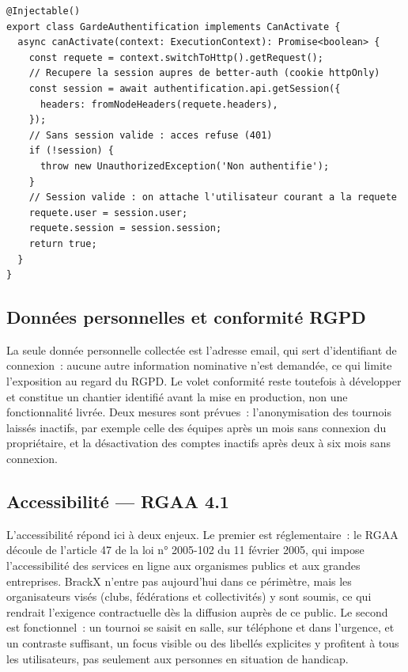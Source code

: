 \begin{lstlisting}
@Injectable()
export class GardeAuthentification implements CanActivate {
  async canActivate(context: ExecutionContext): Promise<boolean> {
    const requete = context.switchToHttp().getRequest();
    // Recupere la session aupres de better-auth (cookie httpOnly)
    const session = await authentification.api.getSession({
      headers: fromNodeHeaders(requete.headers),
    });
    // Sans session valide : acces refuse (401)
    if (!session) {
      throw new UnauthorizedException('Non authentifie');
    }
    // Session valide : on attache l'utilisateur courant a la requete
    requete.user = session.user;
    requete.session = session.session;
    return true;
  }
}
\end{lstlisting}

\subsection{Données personnelles et conformité RGPD}
La seule donnée personnelle collectée est l'adresse email, qui sert d'identifiant de connexion~: aucune autre information nominative n'est demandée, ce qui limite l'exposition au regard du RGPD. Le volet conformité reste toutefois à développer et constitue un chantier identifié avant la mise en production, non une fonctionnalité livrée. Deux mesures sont prévues~: l'anonymisation des tournois laissés inactifs, par exemple celle des équipes après un mois sans connexion du propriétaire, et la désactivation des comptes inactifs après deux à six mois sans connexion.

\subsection{Accessibilité — RGAA 4.1}
L'accessibilité répond ici à deux enjeux. Le premier est réglementaire~: le RGAA découle de l'article 47 de la loi n° 2005-102 du 11 février 2005, qui impose l'accessibilité des services en ligne aux organismes publics et aux grandes entreprises. BrackX n'entre pas aujourd'hui dans ce périmètre, mais les organisateurs visés (clubs, fédérations et collectivités) y sont soumis, ce qui rendrait l'exigence contractuelle dès la diffusion auprès de ce public. Le second est fonctionnel~: un tournoi se saisit en salle, sur téléphone et dans l'urgence, et un contraste suffisant, un focus visible ou des libellés explicites y profitent à tous les utilisateurs, pas seulement aux personnes en situation de handicap.

